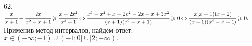 62. $\cfrac{x}{x+1}-\cfrac{2x}{x^2-x+1}\geqslant\cfrac{x-2x^2}{x^3+1}\Leftrightarrow \cfrac{x^3-x^2+x-2x^2-2x-x+2x^2}{(x+1)(x^2-x+1)}\geqslant0
\Leftrightarrow \cfrac{x(x+1)(x-2)}{(x+1)(x^2-x+1)}\geqslant0.$ Применив метод интервалов, найдём ответ: $x\in (-\infty;-1)\cup(-1;0]\cup[2;+\infty).$
\begin{figure}[ht!]
\end{figure}\\
